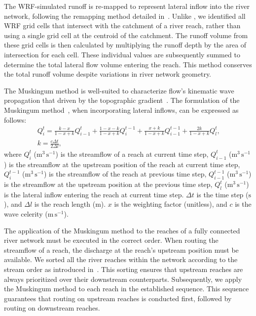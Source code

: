 \documentclass[draft]{agujournal2019}
\begin{document}
The WRF-simulated runoff is re-mapped to represent lateral inflow into the river network, following the remapping method detailed in~\cite{lin2018EMS, wang2019CSB}. Unlike , we identified all WRF grid cells that intersect with the catchment of a river reach, rather than using a single grid cell at the centroid of the catchment. The runoff volume from these grid cells is then calculated by multiplying the runoff depth by the area of intersection for each cell. These individual values are subsequently summed to determine the total lateral flow volume entering the reach. This method conserves the total runoff volume despite variations in river network geometry.

The Muskingum method is well-suited to characterize flow's kinematic wave propagation that driven by the topographic gradient~\cite{ponce1978JHD}. The formulation of the Muskingum method~\cite{cunge1969JHD, fenton2019JH}, when incorporating lateral inflows, can be expressed as follows:
\begin{eqnarray}
  Q_{i}^{t} = \frac{k - x}{1 - x + k} Q_{i-1}^{t} + \frac{1 - x - k}{1 - x + k} Q_{i}^{t-1} + \frac{x + k}{1 - x + k} Q_{i-1}^{t-1} + \frac{2k}{1 - x + k} Q_l^t \textrm{,} \label{eq:muskingum}\\
  k  = \frac{c \Delta t} {2 \Delta l} \textrm{,}
\end{eqnarray}
where $Q_{i}^{t}$ ($\textrm{m}^3\,\textrm{s}^{-1}$) is the streamflow of a reach at current time step, $Q_{i-1}^{t}$ ($\textrm{m}^3\,\textrm{s}^{-1}$) is the streamflow at the upstream position of the reach at current time step, $Q_{i}^{t-1}$ ($\textrm{m}^3\,\textrm{s}^{-1}$) is the streamflow of the reach at previous time step, $Q_{i-1}^{t-1}$ ($\textrm{m}^3\,\textrm{s}^{-1}$) is the streamflow at the upstream position at the previous time step, $Q_l^t$ ($\textrm{m}^3\,\textrm{s}^{-1}$) is the lateral inflow entering the reach at current time step. $\Delta t$ is the time step ($\textrm{s}$), and $\Delta l$ is the reach length ($\textrm{m}$). $x$ is the weighting factor (unitless), and $c$ is the wave celerity ($\textrm{m}\,\textrm{s}^{-1}$).

The application of the Muskingum method to the reaches of a fully connected river network must be executed in the correct order. When routing the streamflow of a reach, the discharge at the reach's upstream position must be available. We sorted all the river reaches within the network according to the stream order as introduced in~\cite{yang2024W}. This sorting ensures that upstream reaches are always prioritized over their downstream counterparts. Subsequently, we apply the Muskingum method to each reach in the established sequence. This sequence guarantees that routing on upstream reaches is conducted first, followed by routing on downstream reaches.
\end{document}
